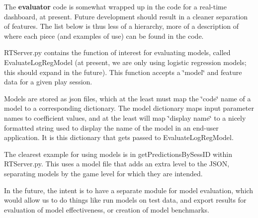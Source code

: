The {\bfseries{evaluator}} code is somewhat wrapped up in the code for a real-\/time dashboard, at present. Future development should result in a cleaner separation of features. The list below is thus less of a hierarchy, more of a description of where each piece (and examples of use) can be found in the code.
\begin{DoxyEnumerate}
\item R\+T\+Server.\+py contains the function of interest for evaluating models, called Evaluate\+Log\+Reg\+Model (at present, we are only using logistic regression models; this should expand in the future). This function accepts a \char`\"{}model\char`\"{} and feature data for a given play session.
\item Models are stored as json files, which at the least must map the \char`\"{}code\char`\"{} name of a model to a corresponding dictionary. The model dictionary maps input parameter names to coefficient values, and at the least will map \char`\"{}display name\char`\"{} to a nicely formatted string used to display the name of the model in an end-\/user application. It is this dictionary that gets passed to Evaluate\+Log\+Reg\+Model.
\item The clearest example for using models is in get\+Predictions\+By\+Sess\+ID within R\+T\+Server.\+py. This uses a model file that adds an extra level to the J\+S\+ON, separating models by the game level for which they are intended.
\end{DoxyEnumerate}

In the future, the intent is to have a separate module for model evaluation, which would allow us to do things like run models on test data, and export results for evaluation of model effectiveness, or creation of model benchmarks. 